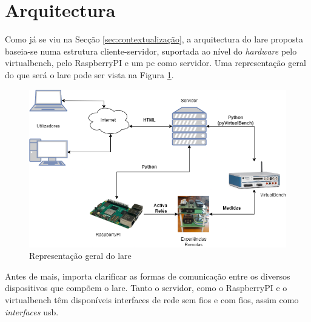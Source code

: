\section{Arquitectura}
\label{sec:arquitectura}
Como já se viu na Secção \ref{sec:contextualização}, a arquitectura do \acrshort{lare} proposta baseia-se numa estrutura cliente-servidor, suportada ao nível do \textit{hardware} pelo \acrshort{virtualbench}, pelo \gls{RaspberryPI} e um \acrshort{pc} como servidor. Uma representação geral do que será o \acrshort{lare} pode ser vista na Figura \ref{fig:representaçãogerallare}.

\begin{figure}[hbtp]
	\centering
	\includegraphics[width=1\textwidth]{figures/arquitectura_ver2.drawio.png}
	\caption{Representação geral do \acrshort{lare}}
	\label{fig:representaçãogerallare}
\end{figure}

Antes de mais, importa clarificar as formas de comunicação entre os diversos dispositivos que compõem o \acrshort{lare}. Tanto o servidor, como o \gls{RaspberryPI} e o \acrshort{virtualbench} têm disponíveis interfaces de rede sem fios e com fios, assim como \textit{interfaces} \acrshort{usb}.

